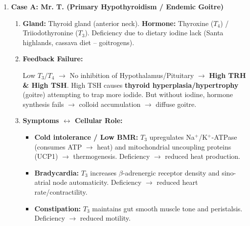 \documentclass[11pt]{article}
\begin{document}
\begin{enumerate}
    \item \textbf{Case A: Mr. T. (Primary Hypothyroidism / Endemic Goitre)}
    \begin{enumerate}
        \item \textbf{Gland:} Thyroid gland (anterior neck). \textbf{Hormone:} Thyroxine ($T_4$) / Triiodothyronine ($T_3$). Deficiency due to dietary iodine lack (Santa highlands, cassava diet -- goitrogens).
        \item \textbf{Feedback Failure:}
        \begin{center}
        \end{center}
        Low $T_3/T_4$ $\rightarrow$ No inhibition of Hypothalamus/Pituitary $\rightarrow$ \textbf{High TRH \& High TSH}. High TSH causes \textbf{thyroid hyperplasia/hypertrophy} (goitre) attempting to trap more iodide. But without iodine, hormone synthesis fails $\rightarrow$ colloid accumulation $\rightarrow$ diffuse goitre.
        \item \textbf{Symptoms $\leftrightarrow$ Cellular Role:}
        \begin{itemize}
            \item \textbf{Cold intolerance / Low BMR:} $T_3$ upregulates Na$^+$/K$^+$-ATPase (consumes ATP $\rightarrow$ heat) and mitochondrial uncoupling proteins (UCP1) $\rightarrow$ thermogenesis. Deficiency $\rightarrow$ reduced heat production.
            \item \textbf{Bradycardia:} $T_3$ increases $\beta$-adrenergic receptor density and sino-atrial node automaticity. Deficiency $\rightarrow$ reduced heart rate/contractility.
            \item \textbf{Constipation:} $T_3$ maintains gut smooth muscle tone and peristalsis. Deficiency $\rightarrow$ reduced motility.
        \end{itemize}
    \end{enumerate}


\end{enumerate}
\end{document}
